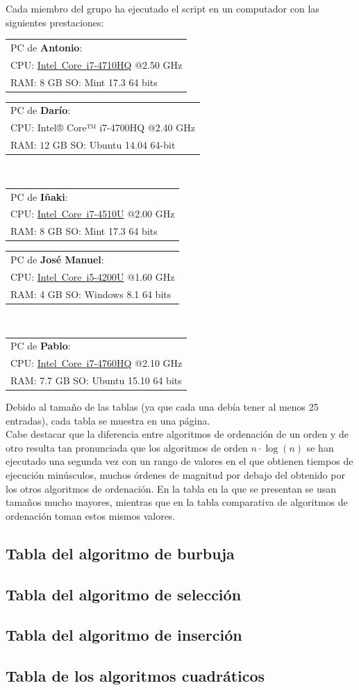 \documentclass[a4paper, 11pt]{article}
\makeatletter
\newcommand{\spec}[5]{
\bgroup
\def\arraystretch{1.2}
\begin{tabular}{|l|}
\hline
PC de \textbf{#1}:\\
CPU: #2 @#3 GHz\\RAM: #4 GB \hspace{0.8cm} SO: #5 \\
\hline
\end{tabular}
\egroup
\vspace*{0.2cm}
}
\makeatother
\begin{document}
Cada miembro del grupo ha ejecutado el script en un computador con las siguientes prestaciones:

\noindent
\spec{Antonio}{\href{http://ark.intel.com/products/78930}{Intel\textregistered\ Core\texttrademark\ i7-4710HQ}}{2.50}{8}{Mint 17.3 64 bits}
\spec{Darío}{Intel® Core™ i7-4700HQ}{2.40}{$12$}{Ubuntu 14.04 64-bit} \\
\spec{Iñaki}{\href{http://ark.intel.com/products/81015}{Intel\textregistered\ Core\texttrademark\ i7-4510U}}{2.00}{8}{Mint 17.3 64 bits}
\spec{José Manuel}{\href{http://ark.intel.com/es-es/products/75459/}{Intel\textregistered\ Core\texttrademark\ i5-4200U}}{1.60}{4}{Windows 8.1 64 bits} \\
\spec{Pablo}{\href{http://ark.intel.com/es-es/products/76090/}{Intel\textregistered\ Core\texttrademark\ i7-4760HQ}}{2.10}{7.7}{Ubuntu 15.10 64 bits}

Debido al tamaño de las tablas (ya que cada una debía tener al menos 25 entradas),
cada tabla se muestra en una página. \\

Cabe destacar que la diferencia entre algoritmos de ordenación de un orden y de
otro resulta tan pronunciada que los algoritmos de orden $n \cdot \log (n)$ se
han ejecutado una segunda vez con un rango de valores en el que obtienen tiempos
de ejecución minúsculos, muchos órdenes de magnitud por debajo del obtenido por
los otros algoritmos de ordenación. En la tabla en la que se presentan se usan
tamaños mucho mayores, mientras que en la tabla comparativa de algoritmos de
ordenación toman estos mismos valores.

\subsection{Tabla del algoritmo de burbuja}


\subsection{Tabla del algoritmo de selección}


\subsection{Tabla del algoritmo de inserción}


\newpage
\subsection{Tabla de los algoritmos cuadráticos}
\end{document}
